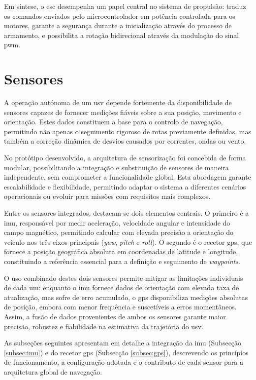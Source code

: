 Em síntese, o \gls{esc} desempenha um papel central no sistema de propulsão: traduz os comandos enviados pelo microcontrolador em potência controlada para os motores, garante a segurança durante a inicialização através do processo de armamento, e possibilita a rotação bidirecional através da modulação do sinal \gls{pwm}.

\section{Sensores} 
\label{sec:sensores}

A operação autónoma de um \gls{usv} depende fortemente da disponibilidade de sensores capazes de fornecer medições fiáveis sobre a sua posição, movimento e orientação. Estes dados constituem a base para o controlo de navegação, permitindo não apenas o seguimento rigoroso de rotas previamente definidas, mas também a correção dinâmica de desvios causados por correntes, ondas ou vento.  

No protótipo desenvolvido, a arquitetura de sensorização foi concebida de forma modular, possibilitando a integração e substituição de sensores de maneira independente, sem comprometer a funcionalidade global. Esta abordagem garante escalabilidade e flexibilidade, permitindo adaptar o sistema a diferentes cenários operacionais ou evoluir para missões com requisitos mais complexos.  

Entre os sensores integrados, destacam-se dois elementos centrais. O primeiro é a \acrfull{imu}, responsável por medir aceleração, velocidade angular e intensidade do campo magnético, permitindo calcular com elevada precisão a orientação do veículo nos três eixos principais (\emph{yaw}, \emph{pitch} e \emph{roll}). O segundo é o recetor \acrfull{gps}, que fornece a posição geográfica absoluta em coordenadas de latitude e longitude, constituindo a referência essencial para a definição e seguimento de \emph{waypoints}.  

O uso combinado destes dois sensores permite mitigar as limitações individuais de cada um: enquanto o \gls{imu} fornece dados de orientação com elevada taxa de atualização, mas sofre de erro acumulado, o \gls{gps} disponibiliza medições absolutas de posição, embora com menor frequência e suscetíveis a erros momentâneos. Assim, a fusão de dados provenientes de ambos os sensores garante maior precisão, robustez e fiabilidade na estimativa da trajetória do \gls{usv}.  

As subseções seguintes apresentam em detalhe a integração da \acrfull{imu} (Subsecção \ref{subsec:imu}) e do recetor \acrfull{gps} (Subsecção \ref{subsec:gps}), descrevendo os princípios de funcionamento, a configuração adotada e o contributo de cada sensor para a arquitetura global de navegação.


